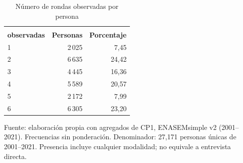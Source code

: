 \begin{table}[!htbp]
\centering
\caption{Número de rondas observadas por persona}\label{tab:cp1-participacion}
\small\setlength{\tabcolsep}{4pt}
\renewcommand{\arraystretch}{1.15}
\begin{tabular}{lrr}
\toprule
\shortstack[c]{\textbf{Rondas}\\\textbf{observadas}} & \textbf{Personas} & \textbf{Porcentaje} \\
\midrule
1 & 2\,025 & 7,45 \\
2 & 6\,635 & 24,42 \\
3 & 4\,445 & 16,36 \\
4 & 5\,589 & 20,57 \\
5 & 2\,172 & 7,99 \\
6 & 6\,305 & 23,20 \\
\bottomrule
\end{tabular}
\par\medskip
\parbox{\linewidth}{\footnotesize Fuente: elaboración propia con agregados de CP1, ENASEMsimple v2 (2001--2021). Frecuencias sin ponderación. Denominador: 27,171 personas únicas de 2001--2021. Presencia incluye cualquier modalidad; no equivale a entrevista directa.}
\end{table}
